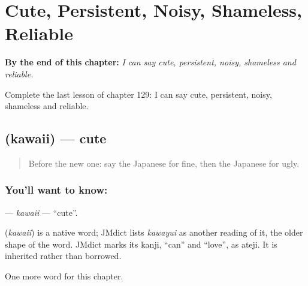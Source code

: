
\chapter{Cute, Persistent, Noisy, Shameless, Reliable}
\label{ch:ja-cute-persistent-noisy-shameless-reliable}

\begin{chapteropening}
\textbf{By the end of this chapter:} \emph{I can say cute, persistent, noisy, shameless and reliable.}

Complete the last lesson of chapter 129: I can say cute, persistent, noisy, shameless and reliable.
\end{chapteropening}

\section[\texorpdfstring{\ja{かわいい} (kawaii)}{かわいい (kawaii)}]{ (kawaii) — cute}

\label{lesson:JA-C129-kawaii}



\begin{quote}
Before the new one: say the Japanese for fine, then the Japanese for ugly.
\end{quote}

\subsection*{You'll want to know: }
\textbf{} — \emph{kawaii} — \textquotedblleft{}cute\textquotedblright{}.

\begin{cousinweb}
\textbf{} (\emph{kawaii}) is a native word; JMdict lists \emph{kawayui} as another reading of it, the older shape of the word. JMdict marks its kanji, \textquotedblleft{}can\textquotedblright{} and \textquotedblleft{}love\textquotedblright{}, as ateji. It is inherited rather than borrowed.
\end{cousinweb}

\begin{grammarlens}[title={What you've built}]
One more word for this chapter.
\end{grammarlens}


